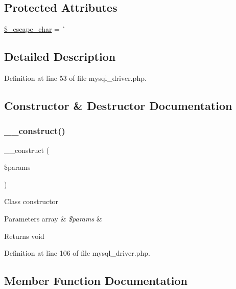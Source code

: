 \subsection*{Protected Attributes}
\begin{DoxyCompactItemize}
\item 
\mbox{\hyperlink{class_c_i___d_b__mysql__driver_aaec2fb0112850159063a8e47ad3aed6e}{\$\+\_\+escape\+\_\+char}} = \textquotesingle{}\`{}\textquotesingle{}
\end{DoxyCompactItemize}


\subsection{Detailed Description}


Definition at line 53 of file mysql\+\_\+driver.\+php.



\subsection{Constructor \& Destructor Documentation}
\mbox{\label{class_c_i___d_b__mysql__driver_a9162320adff1a1a4afd7f2372f753a3e}} 
\subsubsection{\texorpdfstring{\_\_construct()}{\_\_construct()}}
{\footnotesize\ttfamily \+\_\+\+\_\+construct (\begin{DoxyParamCaption}\item[{}]{\$params }\end{DoxyParamCaption})}

Class constructor


\begin{DoxyParams}[1]{Parameters}
array & {\em \$params} & \\
\hline
\end{DoxyParams}
\begin{DoxyReturn}{Returns}
void 
\end{DoxyReturn}


Definition at line 106 of file mysql\+\_\+driver.\+php.



\subsection{Member Function Documentation}
\mbox{\label{class_c_i___d_b__mysql__driver_a4d9082658000e5ede8312067c6dda9db}} 
